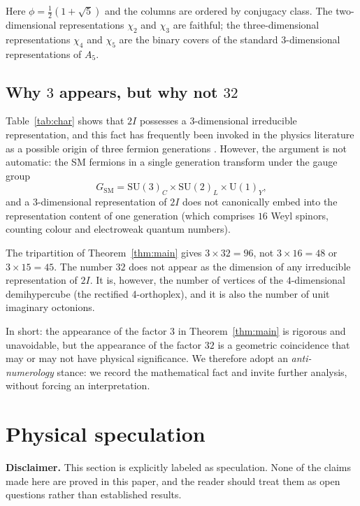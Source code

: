 \documentclass[10pt,reqno]{amsart}
\theoremstyle{plain}
\theoremstyle{definition}
\begin{document}
Here $\phi = \frac12(1+\sqrt5)$ and the columns are ordered by conjugacy class. The two-dimensional representations $\chi_2$ and $\chi_3$ are faithful; the three-dimensional representations $\chi_4$ and $\chi_5$ are the binary covers of the standard $3$-dimensional representations of $A_5$.

\subsection{Why $3$ appears, but why not $32$}

Table~\ref{tab:char} shows that $2I$ possesses a $3$-dimensional irreducible representation, and this fact has frequently been invoked in the physics literature as a possible origin of three fermion generations \cite{Wilson2021,KingFarnsworth2018}. However, the argument is not automatic: the SM fermions in a single generation transform under the gauge group
\begin{equation}
G_{\text{SM}} = \mathrm{SU}(3)_C \times \mathrm{SU}(2)_L \times \mathrm{U}(1)_Y,
\end{equation}
and a $3$-dimensional representation of $2I$ does not canonically embed into the representation content of one generation (which comprises $16$ Weyl spinors, counting colour and electroweak quantum numbers).

The tripartition of Theorem~\ref{thm:main} gives $3 \times 32 = 96$, not $3 \times 16 = 48$ or $3 \times 15 = 45$. The number $32$ does not appear as the dimension of any irreducible representation of $2I$. It is, however, the number of vertices of the $4$-dimensional demihypercube (the rectified 4-orthoplex), and it is also the number of unit imaginary octonions.

In short: the appearance of the factor $3$ in Theorem~\ref{thm:main} is rigorous and unavoidable, but the appearance of the factor $32$ is a geometric coincidence that may or may not have physical significance. We therefore adopt an \emph{anti-numerology} stance: we record the mathematical fact and invite further analysis, without forcing an interpretation.

\section{Physical speculation}\label{sec:speculation}

\textbf{Disclaimer.} This section is explicitly labeled as speculation. None of the claims made here are proved in this paper, and the reader should treat them as open questions rather than established results.
\end{document}
